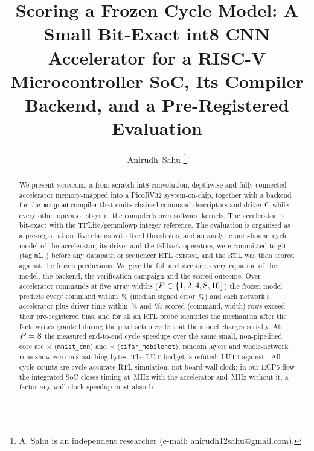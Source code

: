 \documentclass[journal]{IEEEtran}
\newcommand{\sys}{\textsc{mcuaccel}}
\begin{document}
\title{Scoring a Frozen Cycle Model: A Small Bit-Exact int8 CNN Accelerator for a RISC-V Microcontroller SoC, Its Compiler Backend, and a Pre-Registered Evaluation}
\author{Anirudh~Sahu%
\thanks{A. Sahu is an independent researcher (e-mail: anirudh12sahu@gmail.com).}}
\maketitle

\begin{abstract}
We present \sys{}, a from-scratch int8 convolution, depthwise and fully connected accelerator memory-mapped into a PicoRV32 system-on-chip, together with a backend for the \texttt{mcugrad} compiler that emits chained command descriptors and driver C while every other operator stays in the compiler's own software kernels. The accelerator is bit-exact with the TFLite/gemmlowp integer reference. The evaluation is organised as a pre-registration: five claims with fixed thresholds, and an analytic port-bound cycle model of the accelerator, its driver and the fallback operators, were committed to git (tag \texttt{m1}, \MOneCommitShort) before any datapath or sequencer RTL existed, and the RTL was then scored against the frozen predictions. We give the full architecture, every equation of the model, the backend, the verification campaign and the scored outcome. Over \MOneRows{} accelerator commands at five array widths ($P\in\{1, 2, 4, 8, 16\}$) the frozen model predicts every command within \MeasCfourMaxErr\,\% (median signed error \MeasCfourMedianErr\,\%) and each network's accelerator-plus-driver time within \MeasCfourBErrMnist\,\% and \MeasCfourBErrCifar\,\%; \NExceed{} scored (command, width) rows exceed their pre-registered bias, and for all \TieNProbed{} an RTL probe identifies the mechanism after the fact: writes granted during the pixel setup cycle that the model charges serially. At $P=8$ the measured end-to-end cycle speedups over the same small, non-pipelined core are \MeasSpeedupMnistPeight$\times$ (\texttt{mnist\_cnn}) and \MeasSpeedupCifarPeight$\times$ (\texttt{cifar\_mobilenet}); \MeasCtwoALayers{} random layers and whole-network runs show zero mismatching bytes. The LUT budget is refuted: \SynAccelPeightLut{} LUT4 against \BudgetLut{}. All cycle counts are cycle-accurate RTL simulation, not board wall-clock; in our ECP5 flow the integrated SoC closes timing at \SynSocPeightFmax{}\,MHz with the accelerator and \SynSocNoAccelFmax{}\,MHz without it, a factor any wall-clock speedup must absorb.
\end{abstract}
\end{document}
